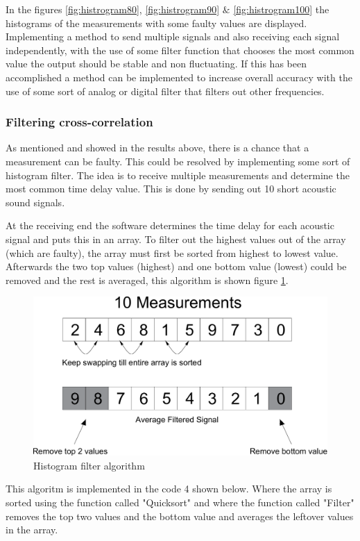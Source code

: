 \documentclass[10pt,a4paper]{article}
\begin{document}
In the figures \ref{fig:histrogram80}, \ref{fig:histrogram90} $\&$ \ref{fig:histrogram100} the histograms of the measurements with some faulty values are displayed. Implementing a method to send multiple signals and also receiving each signal independently, with the use of some filter function that chooses the most common value the output should be stable and non fluctuating. If this has been accomplished a method can be implemented to increase overall accuracy with the use of some sort of analog or digital filter that filters out other frequencies.

\subsubsection{Filtering cross-correlation}
As mentioned and showed in the results above, there is a chance that a measurement can be faulty. This could be resolved by implementing some sort of histogram filter. The idea is to receive multiple measurements and determine the most common time delay value. This is done by sending out 10 short acoustic sound signals.

At the receiving end the software determines the time delay for each acoustic signal and puts this in an array. To filter out the highest values out of the array (which are faulty), the array must first be sorted from highest to lowest value. Afterwards the two top values (highest) and one bottom value (lowest) could be removed and the rest is averaged, this algorithm is shown figure \ref{fig:filter}.

\begin{figure}[H]
   \centering
   \includegraphics[width=\textwidth]{filter.pdf}
   \caption{Histogram filter algorithm}
   \label{fig:filter}
\end{figure}

This algoritm is implemented in the code 4 shown below. Where the array is sorted using the function called "Quicksort" and where the function called "Filter" removes the top two values and the bottom value and averages the leftover values in the array.
\newpage
\end{document}
